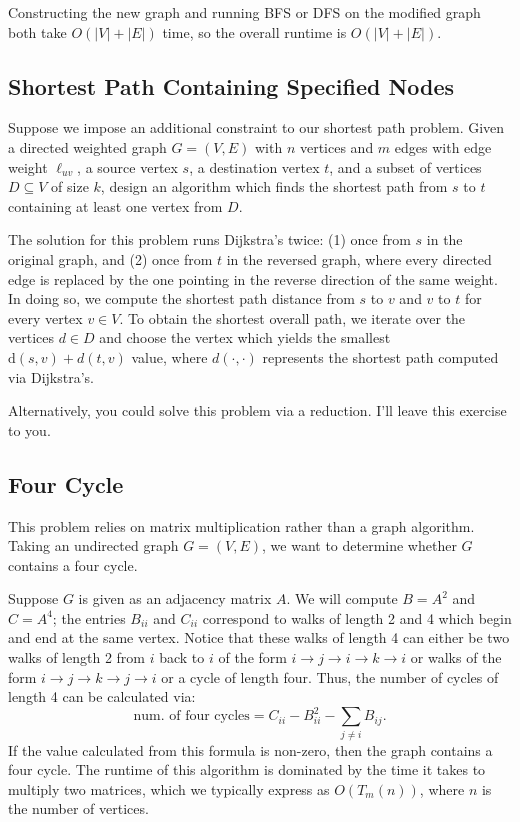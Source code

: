 \documentclass[11pt]{article}
\begin{document}
Constructing the new graph and running BFS or DFS on the modified graph both take $O(|V| + |E|)$ time, so the overall runtime is $O(|V| + |E|)$. 

\subsection{Shortest Path Containing Specified Nodes}\label{SpecifiedNodes}
Suppose we impose an additional constraint to our shortest path problem. Given a directed weighted graph $G = (V, E)$ with $n$ vertices and $m$ edges with edge weight $\ell_{uv}$, a source vertex $s$, a destination vertex $t$, and a subset of vertices $D \subseteq V$ of size $k$, design an algorithm which finds the shortest path from $s$ to $t$ containing at least one vertex from $D$.

The solution for this problem runs Dijkstra's twice: (1) once from $s$ in the original graph, and (2) once from $t$ in the reversed graph, where every directed edge is replaced by the one pointing in the reverse direction of the same weight. In doing so, we compute the shortest path distance from $s$ to $v$ and $v$ to $t$ for every vertex $v \in V$. To obtain the shortest overall path, we iterate over the vertices $d \in D$ and choose the vertex which yields the smallest $\text{d}(s, v) + d(t, v)$ value, where $d(\cdot, \cdot)$ represents the shortest path computed via Dijkstra's. 

Alternatively, you could solve this problem via a reduction. I'll leave this exercise to you. 

\subsection{Four Cycle}
This problem relies on matrix multiplication rather than a graph algorithm. Taking an undirected graph $G = (V, E)$, we want to determine whether $G$ contains a four cycle. 

Suppose $G$ is given as an adjacency matrix $A$. We will compute $B = A^2$ and $C = A^4$; the entries $B_{ii}$ and $C_{ii}$ correspond to walks of length 2 and 4 which begin and end at the same vertex. Notice that these walks of length 4 can either be two walks of length 2 from $i$ back to $i$ of the form $i \to j \to i \to k \to i$ or walks of the form $i \to j \to k \to j \to i$ or a cycle of length four. Thus, the number of cycles of length 4 can be calculated via:
\begin{equation*}
    \text{num. of four cycles} = C_{ii} - B_{ii}^2 - \sum_{j \neq i} B_{ij}.
\end{equation*}
If the value calculated from this formula is non-zero, then the graph contains a four cycle. The runtime of this algorithm is dominated by the time it takes to multiply two matrices, which we typically express as $O(T_m(n))$, where $n$ is the number of vertices. 
\end{document}
